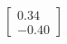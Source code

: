 \documentclass[preview]{standalone}
\begin{document}
\begin{align*}
\begin{bmatrix} 0.34 \\ -0.40 \end{bmatrix}
\end{align*}
\end{document}
